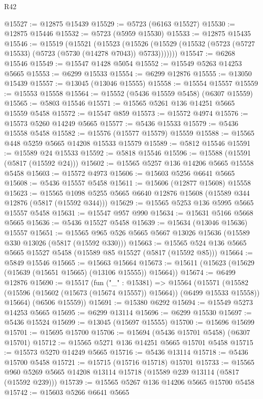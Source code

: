 \begin{lexlean}{R42}
\begin{coremodule}
@15527 := @12875 @15439
@15529 := @5723 (@6163 @15527)
@15530 := @12875 @15446
@15532 := @5723 (@5959 @15530)
@15533 := @12875 @15435
@15546 := @15519
    (@15521
      (@15523
        (@15526 (@15529 (@15532 (@5723 (@5727 @15533) (@5723 (@5730 (@14278 @7043)) @5733)))))))
@15547 := @6268 @15546
@15549 := @15547 @1428 @5054
@15552 := @15549 @5263 @14253 @5665
@15553 := @6299 @15533
@15554 := @6299 @12876
@15555 := @13050 @15439
@15557 := @13045 (@13046 @15555)
@15558 := @15554 @15557
@15559 := @15553 @15558
@15564 := @15552 (@5436 @15559 @5458) (@6307 @15559)
@15565 := @5803 @15546
@15571 := @15565 @5261 @136 @14251 @5665 @15559 @5458
@15572 := @15547 @859
@15573 := @15572 @4974
@15576 := @15573 @5260 @14249 @5665
@15577 := @5436 @15533
@15579 := @5436 @15558 @5458
@15582 := @15576 (@15577 @15579) @15559
@15588 := @15565 @448 @5259 @5665 @14208 @15533 @15579
@15589 := @5812 @15546
@15591 := @15589 @24 @15533
@15592 := @5818 @15546
@15596 := @15588 (@15591 (@5817 (@15592 @24)))
@15602 := @15565 @5257 @136 @14206 @5665 @15558 @5458
@15603 := @15572 @4973
@15606 := @15603 @5256 @6641 @5665
@15608 := @5436 @15557 @5458
@15611 := @15606 (@12877 @15608) @15558
@15623 := @15565 @1098 @5255 @5665 @6640 @12876 @15608 (@15589 @344 @12876 (@5817 (@15592 @344)))
@15629 := @15565 @5253 @136 @5995 @5665 @15557 @5458
@15631 := @15547 @957 @990
@15634 := @15631 @5166 @5668 @5665
@15636 := @5436 @15527 @5458
@15639 := @15634 (@13046 @15636) @15557
@15651 := @15565 @965 @526 @5665 @5667 @13026 @15636 (@15589 @330 @13026 (@5817 (@15592 @330)))
@15663 := @15565 @524 @136 @5665 @5665 @15527 @5458 (@15589 @85 @15527 (@5817 (@15592 @85)))
@15664 := @5849 @15546
@15665 := @15663 @15664
@15673 := @15611 (@15623 (@15629 (@15639 (@15651 @15665) (@13106 @15555)) @15664))
@15674 := @6499 @12876
@15690 := @15517
    (fun ("_" : @15381) =>
    @15564
      (@15571
        (@15582 (@15596 (@15602 (@15673 (@15674 @15557)) @15664)) (@6499 @15533 @15558))
        @15664)
      (@6506 @15559))
@15691 := @15380 @6292
@15694 := @15549 @5273 @14253 @5665
@15695 := @6299 @13114
@15696 := @6299 @15530
@15697 := @5436 @15524
@15699 := @13045 (@15697 @15555)
@15700 := @15696 @15699
@15701 := @15695 @15700
@15706 := @15694 (@5436 @15701 @5458) (@6307 @15701)
@15712 := @15565 @5271 @136 @14251 @5665 @15701 @5458
@15715 := @15573 @5270 @14249 @5665
@15716 := @5436 @13114
@15718 := @5436 @15700 @5458
@15721 := @15715 (@15716 @15718) @15701
@15733 := @15565 @960 @5269 @5665 @14208 @13114 @15718 (@15589 @239 @13114 (@5817 (@15592 @239)))
@15739 := @15565 @5267 @136 @14206 @5665 @15700 @5458
@15742 := @15603 @5266 @6641 @5665

\end{coremodule}
\end{lexlean}
